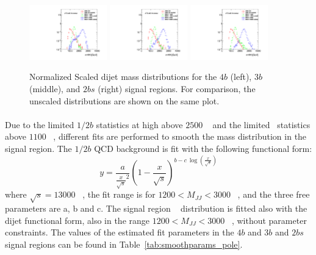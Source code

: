 \begin{figure}[htbp!]
\begin{center}
\includegraphics[width=0.3\textwidth,angle=-90]{figures/boosted/Other/FourTag_Signal_compare_scale_mHH_1.pdf}
\includegraphics[width=0.3\textwidth,angle=-90]{figures/boosted/Other/ThreeTag_Signal_compare_scale_mHH_1.pdf}
\includegraphics[width=0.3\textwidth,angle=-90]{figures/boosted/Other/TwoTag_split_Signal_compare_scale_mHH_1.pdf}
\caption{Normalized Scaled dijet mass distributions for the $4b$ (left), $3b$ (middle), and $2bs$ (right) signal regions. For comparison, the unscaled distributions are shown on the same plot. }
\label{fig:signal-region-bkg-scaled}
\end{center}
\end{figure}

\paragraph{} 
Due to the limited $1/2b$ statistics at high \mtwoJ above $2500$ \GeV~ and the limited \ttbar\ statistics above $1100$ \GeV~, different fits are performed to smooth the \mtwoJ mass distribution in the signal region. 
The $1/2b$ QCD background is fit with the following functional form:
\begin{equation}
\label{eq:boosted_dijet}
y = \frac{a}{\frac{x}{\sqrt{s}}^2} (1-\frac{x}{\sqrt{s}})^{b - c\ \log(\frac{x}{\sqrt{s}})}
\end{equation}
where $\sqrt{s} = 13000$ \GeV~, the fit range is for $1200 < M_{JJ} < 3000$ \GeV~, and the three free parameters are a, b and c. 
The signal region \ttbar~ distribution is fitted also with the dijet functional form, also in the range $1200 < M_{JJ} < 3000$ \GeV~, without parameter constraints. 
The values of the estimated fit parameters in the $4b$ and $3b$ and $2bs$ signal regions can be found in Table~\ref{tab:smoothparams_pole}.

